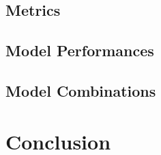 \documentclass[10pt,sigconf]{acmart}
\makeatletter
\newcommand{\specialcellbold}[2][c]{%
  \bfseries
  \begin{tabular}[#1]{@{}l@{}}#2\end{tabular}%
}
\makeatother
\begin{document}

\subsection{Metrics}

\subsection{Model Performances}

\subsection{Model Combinations}


\section{Conclusion}




 
\end{document}
